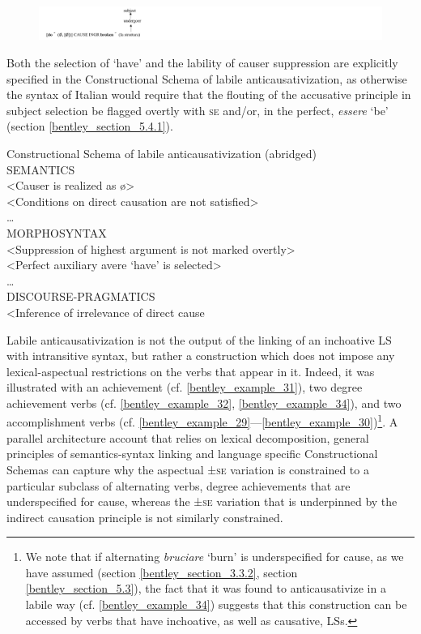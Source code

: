 \documentclass[output=paper,colorlinks,citecolor=brown
]{langscibook}
\begin{document}
\begin{figure}
\centering
\includegraphics[width=2\textwidth]{figures/bentley_figure4.png}
\caption{}
\label{fig:bentley_figure_4}
\end{figure}    

Both the selection of ‘have’ and the lability of causer suppression are explicitly specified in the Constructional Schema of labile anticausativization, as otherwise the syntax of Italian would require that the flouting of the accusative principle in subject selection be flagged overtly with \textsc{se} and/or, in the perfect, \textit{essere} ‘be’ (section \ref{bentley_section_5.4.1}).

\ea  \label{bentley_example_60}
Constructional Schema of labile anticausativization (abridged)\\
SEMANTICS\\
<Causer is realized as \o>\\
<Conditions on direct causation are not satisfied>\\
 \ldots \\
MORPHOSYNTAX\\
<Suppression of highest argument is not marked overtly>\\
<Perfect auxiliary avere ‘have’ is selected>\\
 \ldots \\
DISCOURSE-PRAGMATICS\\
<Inference of irrelevance of direct cause
\z

Labile anticausativization is not the output of the linking of an inchoative LS with intransitive syntax, but rather a construction which does not impose any lexical-aspectual restrictions on the verbs that appear in it. Indeed, it was illustrated with an achievement (cf. \ref{bentley_example_31}), two degree achievement verbs (cf. \ref{bentley_example_32}, \ref{bentley_example_34}), and two accomplishment verbs (cf. \ref{bentley_example_29}—\ref{bentley_example_30})\footnote{We note that if alternating \textit{bruciare} ‘burn’ is underspecified for cause, as we have assumed (section \ref{bentley_section_3.3.2}, section \ref{bentley_section_5.3}), the fact that it was found to anticausativize in a labile way (cf. \ref{bentley_example_34}) suggests that this construction can be accessed by verbs that have inchoative, as well as causative, LSs.}.  A parallel architecture account that relies on lexical decomposition, general principles of semantics-syntax linking and language specific Constructional Schemas can capture why the aspectual ±\textsc{se} variation is constrained to a particular subclass of alternating verbs, degree achievements that are underspecified for cause, whereas the ±\textsc{se} variation that is underpinned by the indirect causation principle is not similarly constrained.  
\end{document}
